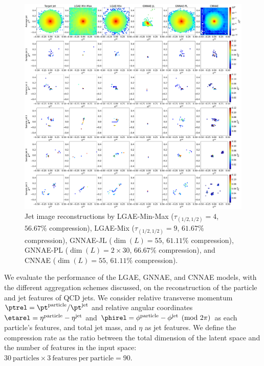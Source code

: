 \begin{figure}[ht!]
    \centering
    \includegraphics[width=\linewidth]{figures/06-ML4Jets/lgae/reconstructions/jet_images-cnnae.pdf}
    \caption[Jet image reconstructions.]{Jet image reconstructions by
        LGAE-Min-Max ($\tau_{(1/2, 1/2)}=4$, $56.67\%$ compression),
        LGAE-Mix ($\tau_{(1/2, 1/2)}=9$, $61.67\%$ compression),
        GNNAE-JL ($\dim(L) = 55$, $61.11\%$ compression), 
        GNNAE-PL ($\dim(L) = 2\times 30$, $66.67\%$ compression), and CNNAE ($\dim(L) = 55$, $61.11\%$ compression).
    }
    \label{fig:06_lgae_recons-jet-imgs}
\end{figure}


We evaluate the performance of the LGAE, GNNAE, and CNNAE models, with the different aggregation schemes discussed, on the reconstruction of the particle and jet features of QCD jets.  
We consider relative transverse momentum
$\ptrel = \pt^{\mathrm{particle}}/\pt^{\mathrm{jet}}$ and relative angular coordinates
$\etarel =\eta^{\mathrm{particle}} - \eta^{\mathrm{jet}}$ and
$\phirel =\phi^{\mathrm{particle}} - \phi^{\mathrm{jet}} \pmod{2\pi}$
as each particle's features, and total jet mass, \pt and $\eta$ as jet features. 
We define the compression rate as the ratio between the total dimension of the latent space and the number of features in the input space: $30\ \mathrm{particles} \times 3\ \mathrm{features\ per\ particle} = 90$.

